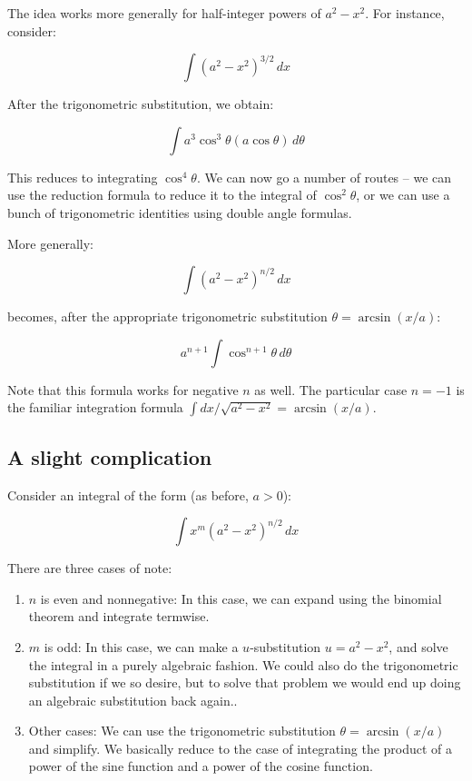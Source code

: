 \documentclass[10pt]{amsart}
\begin{document}
The idea works more generally for half-integer powers of $a^2 -
x^2$. For instance, consider:

$$\int (a^2 - x^2)^{3/2} \, dx$$

After the trigonometric substitution, we obtain:

$$\int a^3 \cos^3 \theta (a \cos \theta) \, d\theta$$

This reduces to integrating $\cos^4 \theta$. We can now go a number of
routes -- we can use the reduction formula to reduce it to the
integral of $\cos^2 \theta$, or we can use a bunch of trigonometric
identities using double angle formulas.

More generally:

$$\int (a^2 - x^2)^{n/2} \, dx$$

becomes, after the appropriate trigonometric substitution $\theta =
\arcsin(x/a)$:

$$a^{n+1} \int \cos^{n+1} \theta \, d\theta$$

Note that this formula works for negative $n$ as well. The particular
case $n = -1$ is the familiar integration formula $\int dx/\sqrt{a^2 -
x^2} = \arcsin(x/a)$.

\subsection{A slight complication}

Consider an integral of the form (as before, $a > 0$):

$$\int x^m (a^2 - x^2)^{n/2} \, dx$$

There are three cases of note:

\begin{enumerate}
\item $n$ is even and nonnegative: In this case, we can expand using
  the binomial theorem and integrate termwise.
\item $m$ is odd: In this case, we can make a $u$-substitution $u =
  a^2 - x^2$, and solve the integral in a purely algebraic fashion. We
  could also do the trigonometric substitution if we so desire, but to
  solve that problem we would end up doing an algebraic substitution
  back again..
\item Other cases: We can use the trigonometric substitution $\theta =
  \arcsin(x/a)$ and simplify. We basically reduce to the case of
  integrating the product of a power of the sine function and a power
  of the cosine function.
\end{enumerate}
\end{document}
